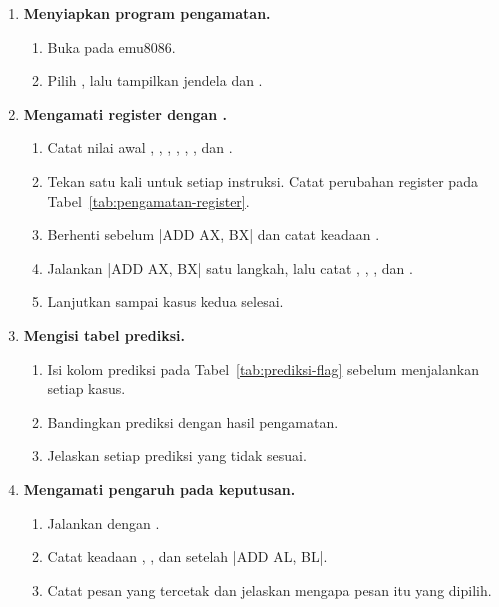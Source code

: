 \begin{enumerate}
    \item \textbf{Menyiapkan program pengamatan.}
    \begin{enumerate}
        \item Buka  pada emu8086.
        \item Pilih , lalu tampilkan
              jendela  dan .
    \end{enumerate}

    \item \textbf{Mengamati register dengan .}
    \begin{enumerate}
        \item Catat nilai awal , , ,
              , , , dan .
        \item Tekan  satu kali untuk setiap
              instruksi. Catat perubahan register pada
              Tabel~\ref{tab:pengamatan-register}.
        \item Berhenti sebelum \lstasm|ADD AX, BX| dan catat keadaan
              .
        \item Jalankan \lstasm|ADD AX, BX| satu langkah, lalu catat
              , , , dan .
        \item Lanjutkan sampai kasus kedua selesai.
    \end{enumerate}

    \item \textbf{Mengisi tabel prediksi.}
    \begin{enumerate}
        \item Isi kolom prediksi pada Tabel~\ref{tab:prediksi-flag}
              sebelum menjalankan setiap kasus.
        \item Bandingkan prediksi dengan hasil pengamatan.
        \item Jelaskan setiap prediksi yang tidak sesuai.
    \end{enumerate}

    \item \textbf{Mengamati pengaruh  pada keputusan.}
    \begin{enumerate}
        \item Jalankan  dengan
              .
        \item Catat keadaan , , dan 
              setelah \lstasm|ADD AL, BL|.
        \item Catat pesan yang tercetak dan jelaskan mengapa pesan
              itu yang dipilih.
    \end{enumerate}


\end{enumerate}
